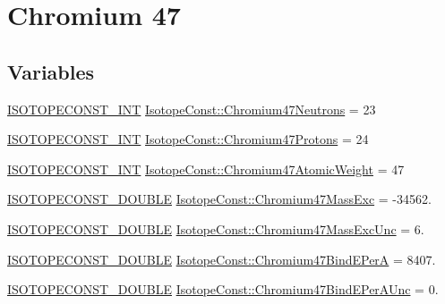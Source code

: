 \hypertarget{group___isotope_const-_chromium-_cr47}{}\section{Chromium 47}
\label{group___isotope_const-_chromium-_cr47}
\subsection*{Variables}
\begin{DoxyCompactItemize}
\item 
\mbox{\hyperlink{group___isotope_const-_macros_ga5f18360b3e99483a35c32d789e62621c}{I\+S\+O\+T\+O\+P\+E\+C\+O\+N\+S\+T\+\_\+\+I\+NT}} \mbox{\hyperlink{group___isotope_const-_chromium-_cr47_ga5e6a0d99a372db529ca728e435f19534}{Isotope\+Const\+::\+Chromium47\+Neutrons}} = 23
\item 
\mbox{\hyperlink{group___isotope_const-_macros_ga5f18360b3e99483a35c32d789e62621c}{I\+S\+O\+T\+O\+P\+E\+C\+O\+N\+S\+T\+\_\+\+I\+NT}} \mbox{\hyperlink{group___isotope_const-_chromium-_cr47_ga12a743f88d3ce0ae27482619da60f9d3}{Isotope\+Const\+::\+Chromium47\+Protons}} = 24
\item 
\mbox{\hyperlink{group___isotope_const-_macros_ga5f18360b3e99483a35c32d789e62621c}{I\+S\+O\+T\+O\+P\+E\+C\+O\+N\+S\+T\+\_\+\+I\+NT}} \mbox{\hyperlink{group___isotope_const-_chromium-_cr47_ga213509251c5f1fff5fc4c1f5cd90b3ae}{Isotope\+Const\+::\+Chromium47\+Atomic\+Weight}} = 47
\item 
\mbox{\hyperlink{group___isotope_const-_macros_ga8f45a7272ce02c0b4c65c44636ed719a}{I\+S\+O\+T\+O\+P\+E\+C\+O\+N\+S\+T\+\_\+\+D\+O\+U\+B\+LE}} \mbox{\hyperlink{group___isotope_const-_chromium-_cr47_ga3ac7f5e06ba9161b9e15e8467bbdb04a}{Isotope\+Const\+::\+Chromium47\+Mass\+Exc}} = -\/34562.
\item 
\mbox{\hyperlink{group___isotope_const-_macros_ga8f45a7272ce02c0b4c65c44636ed719a}{I\+S\+O\+T\+O\+P\+E\+C\+O\+N\+S\+T\+\_\+\+D\+O\+U\+B\+LE}} \mbox{\hyperlink{group___isotope_const-_chromium-_cr47_gaa1ed85c141b5e8d51eeac6ac1e14ef1d}{Isotope\+Const\+::\+Chromium47\+Mass\+Exc\+Unc}} = 6.
\item 
\mbox{\hyperlink{group___isotope_const-_macros_ga8f45a7272ce02c0b4c65c44636ed719a}{I\+S\+O\+T\+O\+P\+E\+C\+O\+N\+S\+T\+\_\+\+D\+O\+U\+B\+LE}} \mbox{\hyperlink{group___isotope_const-_chromium-_cr47_gae39b3317c73b10525a684a12a880c160}{Isotope\+Const\+::\+Chromium47\+Bind\+E\+PerA}} = 8407.
\item 
\mbox{\hyperlink{group___isotope_const-_macros_ga8f45a7272ce02c0b4c65c44636ed719a}{I\+S\+O\+T\+O\+P\+E\+C\+O\+N\+S\+T\+\_\+\+D\+O\+U\+B\+LE}} \mbox{\hyperlink{group___isotope_const-_chromium-_cr47_ga5a4d20bb6a564f0dcc8e3f3f769d1d14}{Isotope\+Const\+::\+Chromium47\+Bind\+E\+Per\+A\+Unc}} = 0.

\end{DoxyCompactItemize}
